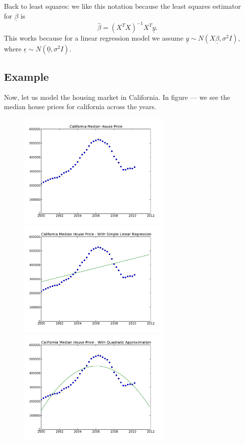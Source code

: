 Back to least squares: we like this notation because the least squares estimator for $\underline{\beta}$ is $$\hat{\beta} = (X^T X)^{-1} X^T \underline{y}.$$ This works because for a linear regression model we assume $\underline{y} \sim N(X\underline{\beta}, \sigma^2 I)$, where $\underline{\epsilon} \sim N(\underline{0}, \sigma^2 I)$.

\subsection*{Example}

Now, let us model the housing market in California. In figure --- we see the median house prices for california across the years. 

\begin{figure}[h]
\centering
\includegraphics[width=3in]{california.pdf}
\includegraphics[width=3in]{cali-linear.pdf}
\includegraphics[width=3in]{cali-quadratic.pdf}
\end{figure}


